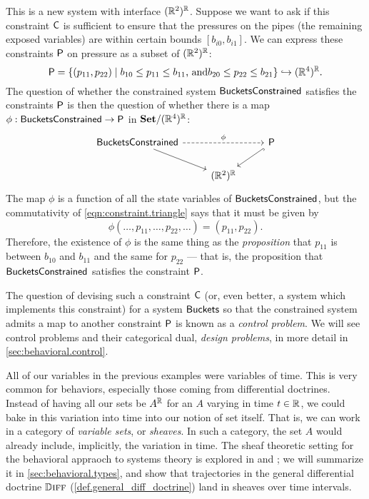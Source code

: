 \documentclass[DynamicalBook]{subfiles}
\begin{document}
This is a new system with interface $(\mathbb{R}^2)^{\mathbb{R}}$. Suppose we want to ask if
this constraint $\mathsf{C}$ is sufficient to ensure that the pressures on the
pipes (the remaining exposed variables) are within certain bounds $[b_{i0}, b_{i1}]$. We can
express these constraints $\mathsf{P}$ on pressure as a subset of
$(\mathbb{R}^{2})^{\mathbb{R}}$:
\[
\mathsf{P} = \{(p_{11}, p_{22}) \mid b_{10} \leq p_{11} \leq b_{11}\text{, and}
b_{20} \leq p_{22} \leq b_{21}\} \hookrightarrow (\mathbb{R}^4)^{\mathbb{R}}.
\]
The question of whether the constrained system $\mathsf{BucketsConstrained}$
satisfies the constraints $\mathsf{P}$ is then the question of whether there is a
map $\phi : \mathsf{BucketsConstrained} \to \mathsf{P}$ in
$\textbf{Set}/(\mathbb{R}^4)^{\mathbb{R}}$: 
\begin{equation}\label{eqn:constraint.triangle}
\begin{tikzcd}
	{\Sys{BucketsConstrained}} && {\Sys{P}} \\
	& {(\rr^2)^{\rr}}
	\arrow[dashed, from=1-1, to=1-3, "\phi"]
	\arrow[from=1-1, to=2-2]
	\arrow[hook, from=1-3, to=2-2]
\end{tikzcd}
\end{equation}
The map $\phi$ is a function of all the state variables of
$\mathsf{BucketsConstrained}$, but the commutativity of
\cref{eqn:constraint.triangle} says that it must be given by 
$$\phi(\ldots, p_{11}, \ldots, p_{22}, \ldots) = (p_{11}, p_{22}).$$
Therefore, the existence of $\phi$ is the same thing as the \emph{proposition}
that $p_{11}$ is between $b_{10}$ and $b_{11}$ and the same for $p_{22}$ ---
that is, the proposition that $\mathsf{BucketsConstrained}$ satisfies the
constraint $\mathsf{P}$. 

The question of devising such a constraint $\mathsf{C}$ (or, even better, a system
which implements this constraint) for a system
$\mathsf{Buckets}$ so that the constrained system admits a map to another
constraint $\mathsf{P}$ is known as a \emph{control problem}. We will see control
problems and their categorical dual, \emph{design problems}, in more detail in \cref{sec:behavioral.control}.

All of our variables in the previous examples were variables of time. This is
very common for behaviors, especially those coming from differential doctrines.
Instead of having all our sets be $A^{\mathbb{R}}$ for an $A$ varying in time $t \in
\mathbb{R}$, we could bake in this variation into time into our notion of set itself.
That is, we can work in a category of \emph{variable sets}, or \emph{sheaves}.
In such a category, the set $A$ would already include, implicitly, the variation
in time. The sheaf theoretic setting for the behavioral appraoch to systems
theory is explored in \cite{schultz2016dynamical} and
\cite{schultz2019temporal}; we will summarize it in \cref{sec:behavioral.types},
and show that trajectories in the general differential doctrine $\mathbb{D}\textsc{iff}$
(\cref{def.general_diff_doctrine}) land in sheaves over time intervals. 
\end{document}
